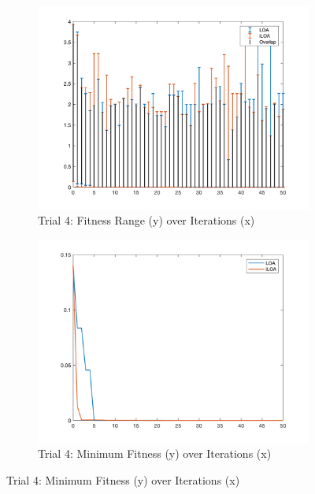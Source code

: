 \begin{figure}
  \begin{subfigure}[b]{0.4\textwidth}
    \includegraphics[width=\textwidth]{img/bars/f1/4}
    \caption{ \scriptsize Trial 4: Fitness Range (y) over Iterations (x)}
    \label{fig:f1-b-4}
  \end{subfigure}
  \begin{subfigure}[b]{0.4\textwidth}
    \includegraphics[width=\textwidth]{img/fits/f1/4}
    \caption{ \scriptsize Trial 4: Minimum Fitness (y) over Iterations (x)}
    \label{fig:f1-f-4}
  \end{subfigure}


\end{figure}
